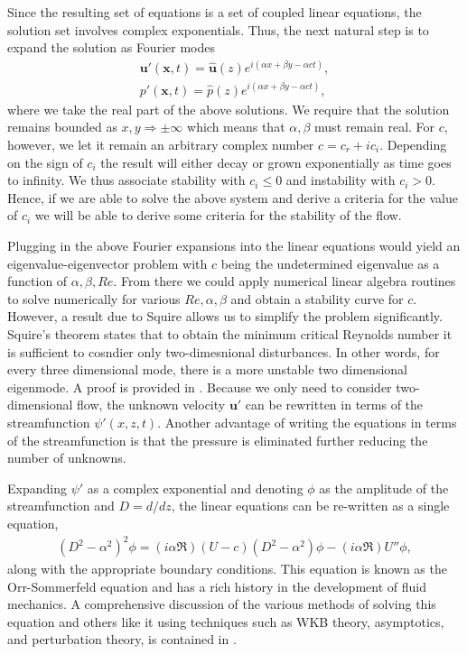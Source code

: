 Since the resulting set of equations is a set of coupled linear equations, the solution set involves complex exponentials. Thus, the next natural step is to expand the solution as Fourier modes  
\begin{align}
\bm{u}'(\bm{x},t) = \hat{\bm{u}}(z)e^{i(\alpha x +\beta y -\alpha ct)},\\
p'(\bm{x},t) = \hat{p}(z)e^{i(\alpha x +\beta y -\alpha ct)},
\end{align}
where we take the real part of the above solutions. We require that the solution remains bounded as $x,y\Rightarrow\pm\infty$ which means that $\alpha,\beta$ must remain real. For $c$, however, we let it remain an arbitrary complex number $c=c_{r} + ic_{i}$. Depending on the sign of $c_{i}$ the result will either decay or grown exponentially as time goes to infinity. We thus associate stability with $c_{i}\le 0$ and instability with $c_{i}>0$. Hence, if we are able to solve the above system and derive a criteria for the value of $c_{i}$ we will be able to derive some criteria for the stability of the flow.

Plugging in the above Fourier expansions into the linear equations would yield an eigenvalue-eigenvector problem with $c$ being the undetermined eigenvalue as a function of $\alpha,\beta,Re$. From there we could apply numerical linear algebra routines to solve numerically for various $Re,\alpha,\beta$ and obtain a stability curve for $c$. However, a result due to Squire allows us to simplify the problem significantly. Squire's theorem states that to obtain the minimum critical Reynolds number it is sufficient to cosndier only two-dimesnional disturbances\cite{drazinreid}. In other words, for every three dimensional mode, there is a more unstable two dimensional eigenmode. A proof is provided in \cite{drazinreid}.  Because we only need to consider two-dimensional flow, the unknown velocity $\bm{u}'$ can be rewritten in terms of the streamfunction $\psi'(x,z,t)$. Another advantage of writing the equations in terms of the streamfunction is that the pressure is eliminated further reducing the number of unknowns. 

Expanding $\psi'$ as a complex exponential and denoting $\phi$ as the amplitude of the streamfunction and $D=d/dz$, the linear equations can be re-written as a single equation, 
\begin{align}
(D^{2}-\alpha^{2})^{2}\phi = (i\alpha \Re)(U-c)(D^{2}-\alpha^{2})\phi -(i\alpha \Re)U''\phi,
\end{align}
along with the appropriate boundary conditions. This equation is known as the Orr-Sommerfeld equation and has a rich history in the development of fluid mechanics. A comprehensive discussion of the various methods of solving this equation and others like it using techniques such as WKB theory, asymptotics, and perturbation theory, is contained in \cite{drazinreid,vandyke,benderorszag}.

